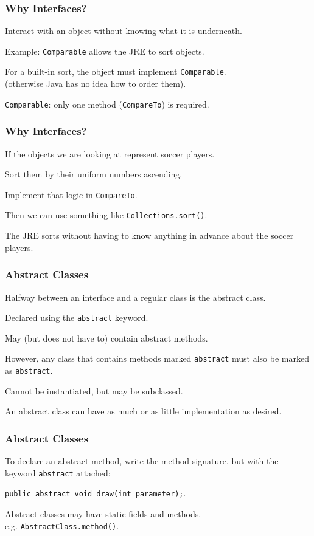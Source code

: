 \begin{frame}
\frametitle{Why Interfaces?}
\begin{changemargin}{1cm}

Interact with an object without knowing what it is underneath. 

Example: \texttt{Comparable} allows the JRE to sort objects.

For a built-in sort, the object must implement \texttt{Comparable}.\\\quad (otherwise Java has no idea how to order them). 

\texttt{Comparable}: only one method (\texttt{CompareTo}) is required.
\end{changemargin}
\end{frame}

\begin{frame}
\frametitle{Why Interfaces?}
\begin{changemargin}{1cm}

 If the objects we are looking at represent soccer players. 
 
 Sort them by their uniform numbers ascending. 
 
 Implement that logic in \texttt{CompareTo}. 
 
 Then we can use something like \texttt{Collections.sort()}. 
 
 The JRE sorts without having to know anything in advance about the soccer players.
\end{changemargin}
\end{frame}

\begin{frame}
\frametitle{Abstract Classes}
\begin{changemargin}{1cm}

Halfway between an interface and a regular class is the \alert{abstract class}. 

Declared using the \texttt{abstract} keyword. 

May (but does not have to) contain abstract methods. 

However, any class that contains methods marked \texttt{abstract} must also be marked as \texttt{abstract}. 

Cannot be instantiated, but may be subclassed. 

An abstract class can have as much or as little implementation as desired.
\end{changemargin}
\end{frame}

\begin{frame}[fragile]
\frametitle{Abstract Classes}
\begin{changemargin}{1cm}

To declare an abstract method, write the method signature, but with the keyword \texttt{abstract} attached: 

\verb+public abstract void draw(int parameter);+.


Abstract classes may have static fields and methods.\\
\quad e.g. \texttt{AbstractClass.method()}.


\end{changemargin}
\end{frame}


